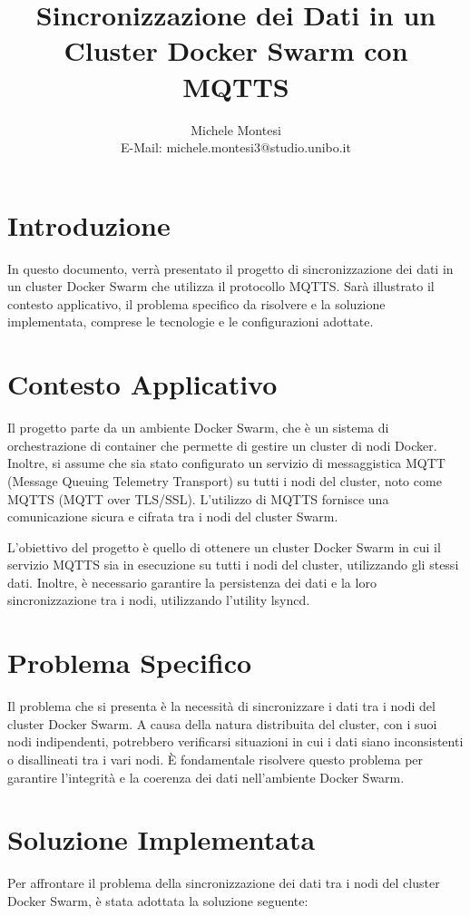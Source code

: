 \documentclass[a4paper, 12pt]{article}
\title{Sincronizzazione dei Dati in un Cluster Docker Swarm con MQTTS}
\author{Michele Montesi \\
        E-Mail: michele.montesi3@studio.unibo.it}
\begin{document}
\maketitle

\section{Introduzione}
In questo documento, verrà presentato il progetto di sincronizzazione 
dei dati in un cluster Docker Swarm che utilizza il protocollo MQTTS. 
Sarà illustrato il contesto applicativo, il problema specifico da risolvere e 
la soluzione implementata, comprese le tecnologie e le configurazioni adottate.

\section{Contesto Applicativo}
Il progetto parte da un ambiente Docker Swarm, che è un sistema di orchestrazione 
di container che permette di gestire un cluster di nodi Docker. Inoltre, si assume 
che sia stato configurato un servizio di messaggistica MQTT (Message Queuing Telemetry Transport) 
su tutti i nodi del cluster, noto come MQTTS (MQTT over TLS/SSL). 
L'utilizzo di MQTTS fornisce una comunicazione sicura e cifrata tra i nodi del cluster Swarm.

L'obiettivo del progetto è quello di ottenere un cluster Docker Swarm in cui il 
servizio MQTTS sia in esecuzione su tutti i nodi del cluster, utilizzando gli stessi dati. 
Inoltre, è necessario garantire la persistenza dei dati e la loro sincronizzazione tra i nodi, 
utilizzando l'utility lsyncd.

\newpage
\section{Problema Specifico}
Il problema che si presenta è la necessità di sincronizzare i dati tra i nodi del 
cluster Docker Swarm. A causa della natura distribuita del cluster, con i suoi nodi 
indipendenti, potrebbero verificarsi situazioni in cui i dati siano inconsistenti o disallineati 
tra i vari nodi. È fondamentale risolvere questo problema per garantire l'integrità e la coerenza 
dei dati nell'ambiente Docker Swarm.

\section{Soluzione Implementata}
Per affrontare il problema della sincronizzazione dei dati tra i nodi del 
cluster Docker Swarm, è stata adottata la soluzione seguente:
\end{document}
